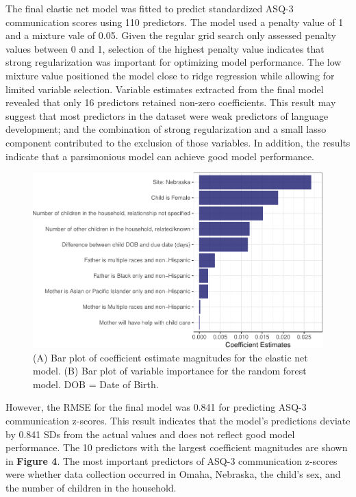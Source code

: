 \documentclass[sn-basic,pdflatex]{sn-jnl}
\begin{document}
The final elastic net model was fitted to predict standardized ASQ-3
communication scores using 110 predictors. The model used a penalty
value of 1 and a mixture vale of 0.05. Given the regular grid search
only assessed penalty values between 0 and 1, selection of the highest
penalty value indicates that strong regularization was important for
optimizing model performance. The low mixture value positioned the model
close to ridge regression while allowing for limited variable selection.
Variable estimates extracted from the final model revealed that only 16
predictors retained non-zero coefficients. This result may suggest that
most predictors in the dataset were weak predictors of language
development; and the combination of strong regularization and a small
lasso component contributed to the exclusion of those variables. In
addition, the results indicate that a parsimonious model can achieve
good model performance.

\begin{figure}

{\centering \includegraphics{HWC_final-paper-draft_files/figure-latex/fig_bar_enet_vi-1} 

}

\caption{(A) Bar plot of coefficient estimate magnitudes for the elastic net model. (B) Bar plot of variable importance for the random forest model. DOB = Date of Birth.}\label{fig:fig_bar_enet_vi}
\end{figure}

However, the RMSE for the final model was 0.841 for predicting ASQ-3
communication z-scores. This result indicates that the model's
predictions deviate by 0.841 SDs from the actual values and does not
reflect good model performance. The 10 predictors with the largest
coefficient magnitudes are shown in \textbf{Figure 4}. The most
important predictors of ASQ-3 communication z-scores were whether data
collection occurred in Omaha, Nebraska, the child's sex, and the number
of children in the household.
\end{document}
